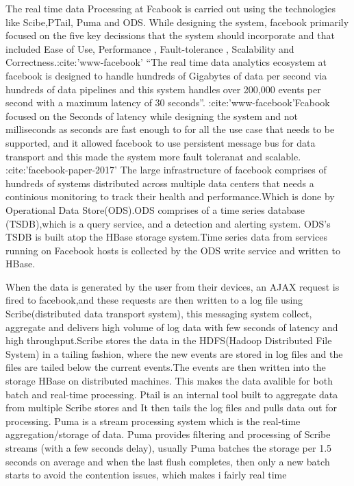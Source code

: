 \begin{enumerate}
The real time data Processing at Fcabook is carried out using the
technologies like Scibe,PTail, Puma and ODS. While designing the
system, facebook primarily focused on the five key decissions
that the system should incorporate and that included Ease of Use,
Performance , Fault-tolerance , Scalability and
Correctness.:cite:'www-facebook' ``The real time data analytics
ecosystem at facebook is designed to handle hundreds of Gigabytes
of data per second via hundreds of data pipelines and this system
handles over 200,000 events per second with a maximum latency of
30 seconds''. :cite:'www-facebook'Fcabook focused on the Seconds
of latency while designing the system and not milliseconds as
seconds are fast enough to for all the use case that needs to be
supported, and it allowed facebook to use persistent message bus
for data transport and this made the system more fault toleranat
and scalable. :cite:'facebook-paper-2017' The large
infrastructure of facebook comprises of hundreds of systems
distributed across multiple data centers that needs a continious
monitoring to track their health and performance.Which is done by
Operational Data Store(ODS).ODS comprises of a time series
database (TSDB),which is a query service, and a detection and
alerting system. ODS’s TSDB is built atop the HBase storage
system.Time series data from services running on Facebook hosts
is collected by the ODS write service and written to HBase.

When the data is generated by the user from their devices, an
AJAX request is fired to facebook,and these requests are then
written to a log file using Scribe(distributed data transport
system), this messaging system collect, aggregate and delivers
high volume of log data with few seconds of latency and high
throughput.Scribe stores the data in the HDFS(Hadoop Distributed
File System) in a tailing fashion, where the new events are
stored in log files and the files are tailed below the current
events.The events are then written into the storage HBase on
distributed machines. This makes the data avalible for both batch
and real-time processing. Ptail is an internal tool built to
aggregate data from multiple Scribe stores and It then tails the
log files and pulls data out for processing. Puma is a stream
processing system which is the real-time aggregation/storage of
data. Puma provides filtering and processing of Scribe streams
(with a few seconds delay), usually Puma batches the storage per
1.5 seconds on average and when the last flush completes, then
only a new batch starts to avoid the contention issues, which
makes i fairly real time


\end{enumerate}

